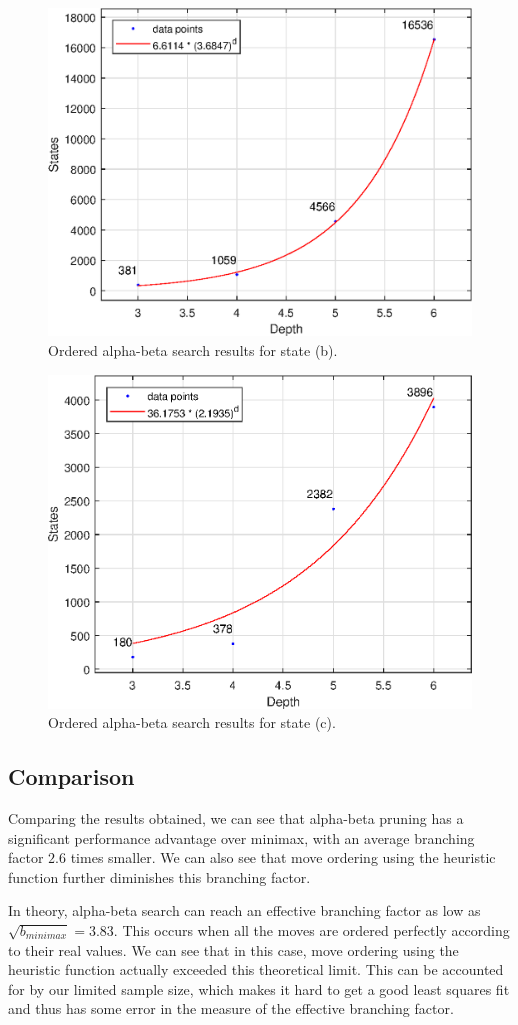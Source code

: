 \documentclass[journal,hidelinks]{IEEEtran}
\begin{document}
\begin{figure}[!htb]
  \centering
  \includegraphics[width=0.6\columnwidth]{state-2/ordered-alpha-beta.eps}
  \caption{Ordered alpha-beta search results for state (b).}
  \label{fig:state-2-ordered-alpha-beta}
\end{figure}

\begin{figure}[!htb]
  \centering
  \includegraphics[width=0.6\columnwidth]{state-3/ordered-alpha-beta.eps}
  \caption{Ordered alpha-beta search results for state (c).}
  \label{fig:state-3-ordered-alpha-beta}
\end{figure}

\subsection{Comparison}

Comparing the results obtained, we can see that alpha-beta pruning has a significant performance advantage over minimax, with an average branching factor $2.6$ times smaller. We can also see that move ordering using the heuristic function further diminishes this branching factor.

In theory, alpha-beta search can reach an effective branching factor as low as $\sqrt{b_{minimax}} = 3.83$. This occurs when all the moves are ordered perfectly according to their real values. We can see that in this case, move ordering using the heuristic function actually exceeded this theoretical limit. This can be accounted for by our limited sample size, which makes it hard to get a good least squares fit and thus has some error in the measure of the effective branching factor.
\end{document}
